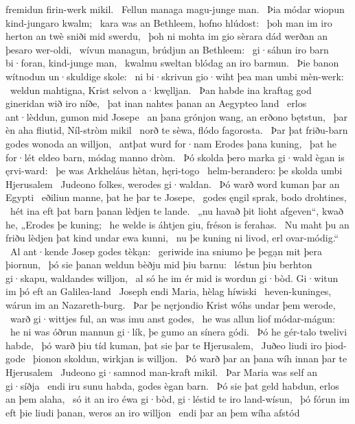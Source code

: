fremidun firin-werk mikil. \hld\ Fellun managa
magu-junge man. \hld\ Þia módar wiopun
kind-jungaro kwalm; \hld\ kara was an Bethleem,
hofno hlúdost: \hld\ þoh man im iro herton an twè
sniði mid swerdu, \hld\ þoh ni mohta im gio sèrara dád
werðan an þesaro wer-oldi, \hld\ wívun managun,
brúdjun an Bethleem: \hld\ gi·sáhun iro barn bi·foran,
kind-junge man, \hld\ kwalmu sweltan
blódag an iro barmun. \hld\ Þie banon wítnodun
un·skuldige skole: \hld\ ni bi·skrivun gio·wiht
þea man umbi mèn-werk: \hld\ weldun mahtigna,
Krist selvon a·kwęlljan. \hld\ Þan habde ina kraftag god
gineridan wið iro níðe, \hld\ þat inan nahtes þanan
an Aegypteo land \hld\ erlos ant·lèddun,
gumon mid Josepe \hld\ an þana grónjon wang,
an erðono bętstun, \hld\ þar èn aha fliutid,
Níl-stròm mikil \hld\ norð te sèwa,
flódo fagorosta. \hld\ Þar þat friðu-barn godes
wonoda an willjon, \hld\ antþat wurd for·nam
Erodes þana kuning, \hld\ þat he for·lét eldeo barn,
módag manno dròm. \hld\ Þó skolda þero marka gi·wald
ègan is ęrvi-ward: \hld\ þe was Arkheláus
hètan, hęri-togo \hld\ helm-berandero:
þe skolda umbi Hjerusalem \hld\ Judeono folkes,
werodes gi·waldan. \hld\ Þó warð word kuman
þar an Egypti \hld\ eðiliun manne,
þat he þar te Josepe, \hld\ godes ęngil sprak,
bodo drohtines, \hld\ hét ina eft þat barn þanan
lèdjen te lande. \hld\ „nu havað þit lioht afgeven“, kwað he,
„Erodes þe kuning; \hld\ he welde is áhtjen giu,
fréson is ferahas. \hld\ Nu maht þu an friðu lèdjen
þat kind undar ewa kunni, \hld\ nu þe kuning ni livod,
erl ovar-módig.“ \hld\ Al ant·kende
Josep godes tèkạn: \hld\ geriwide ina sniumo
þe þegạn mit þera þiornun, \hld\ þó sie þanan weldun
bèðju mid þiu barnu: \hld\ léstun þiu berhton gi·skapu,
waldandes willjon, \hld\ al só he im ér mid is wordun gi·bòd.
Gi·witun im þó eft an Galilea-land \hld\ Joseph endi Maria,
hèlag híwiski \hld\ heven-kuninges,
wárun im an Nazareth-burg. \hld\ Þar þe nęrjondio Krist
wóhs undar þem werode, \hld\ warð gi·wittjes ful,
an was imu anst godes, \hld\ he was allun liof
módar-mágun: \hld\ he ni was óðrun mannun gi·lík,
þe gumo an sínera gódi. \hld\ Þó he gér-talo
twelivi habde, \hld\ þó warð þiu tíd kuman,
þat sie þar te Hjerusalem, \hld\ Juðeo liudi
iro þiod-gode \hld\ þionon skoldun,
wirkjan is willjon. \hld\ Þó warð þar an þana wíh innan
þar te Hjerusalem \hld\ Judeono gi·samnod
man-kraft mikil. \hld\ Þar Maria was
self an gi·síðja \hld\ endi iru sunu habda,
godes ègan barn. \hld\ Þó sie þat geld habdun,
erlos an þem alaha, \hld\ só it an iro éwa gi·bòd,
gi·léstid te iro land-wísun, \hld\ þó fórun im eft þie liudi þanan,
weros an iro willjon \hld\ endi þar an þem wíha afstód
